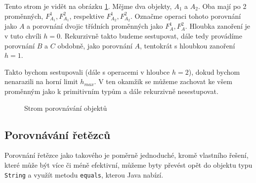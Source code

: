 Tento strom je vidět na obrázku \ref{obr-height}. Mějme dva objekty, $A_1$ a $A_2$. Oba mají po 2 proměnných, $F_{A_1}^1, F_{A_1}^2$, respektive $F_{A_2}^1, F_{A_2}^2$. Označme operaci tohoto porovnání jako $A$ a porovnání dvojic třídních proměnných jako $F_A^1, F_A^2$. Hloubka zanoření je v tuto chvíli $h=0$. Rekurzivně takto budeme sestupovat, dále tedy provádíme porovnání $B$ a $C$ obdobně, jako porovnání $A$, tentokrát s hloubkou zanoření $h=1$.

Takto bychom sestupovali (dále s operacemi v hloubce $h=2$), dokud bychom nenarazili na horní limit $h_{max}$. V ten okamžik se můžeme zachovat ke všem proměnným jako k primitivním typům a dále rekurzivně nesestupovat.

\begin{figure}[ht!]
    \centering
    \caption{Strom porovnávání objektů}
    \label{obr-height}
\end{figure}

\subsection{Porovnávání řetězců}
Porovnání řetězce jako takového je poměrně jednoduché, kromě vlastního řešení, které může být více či méně efektivní, můžeme byty převést opět do objektu typu \texttt{String} a využít metodu \texttt{equals}, kterou Java nabízí.

